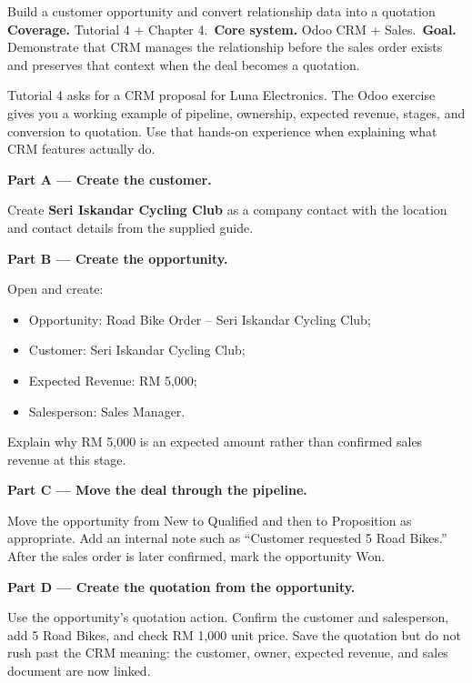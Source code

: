 
\begin{labproject}{Build a customer opportunity and convert relationship data into a quotation}
\textbf{Coverage.} Tutorial 4 + Chapter 4.\
\textbf{Core system.} Odoo CRM + Sales.\
\textbf{Goal.} Demonstrate that CRM manages the relationship before the sales order exists and preserves that context when the deal becomes a quotation.

\begin{labmode}
Tutorial 4 asks for a CRM proposal for Luna Electronics. The Odoo exercise gives you a working example of pipeline, ownership, expected revenue, stages, and conversion to quotation. Use that hands-on experience when explaining what CRM features actually do.
\end{labmode}

\medskip\noindent\textbf{Part A --- Create the customer.}

Create \textbf{Seri Iskandar Cycling Club} as a company contact with the location and contact details from the supplied guide.

\medskip\noindent\textbf{Part B --- Create the opportunity.}

Open  and create:
\begin{itemize}
  \item Opportunity: Road Bike Order -- Seri Iskandar Cycling Club;
  \item Customer: Seri Iskandar Cycling Club;
  \item Expected Revenue: RM 5,000;
  \item Salesperson: Sales Manager.
\end{itemize}

Explain why RM 5,000 is an expected amount rather than confirmed sales revenue at this stage.

\medskip\noindent\textbf{Part C --- Move the deal through the pipeline.}

Move the opportunity from New to Qualified and then to Proposition as appropriate. Add an internal note such as ``Customer requested 5 Road Bikes.'' After the sales order is later confirmed, mark the opportunity Won.

\medskip\noindent\textbf{Part D --- Create the quotation from the opportunity.}

Use the opportunity's quotation action. Confirm the customer and salesperson, add 5 Road Bikes, and check RM 1,000 unit price. Save the quotation but do not rush past the CRM meaning: the customer, owner, expected revenue, and sales document are now linked.


\end{labproject}
